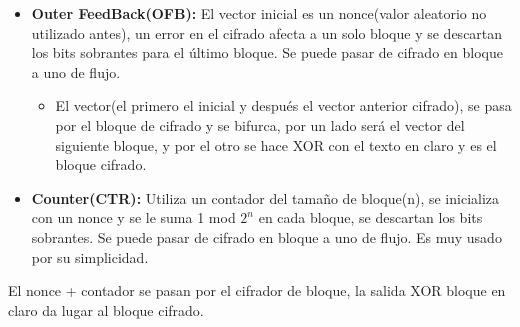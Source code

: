 \documentclass[12pt, twoside, openright]{report} %
\begin{document}
\begin{itemize}
	\item \textbf{Outer FeedBack(OFB):} El vector inicial es un nonce(valor aleatorio no utilizado antes), un error en el cifrado afecta a un solo bloque y se descartan los bits sobrantes para el último bloque. Se puede pasar de cifrado en bloque a uno de flujo.
	      \begin{itemize}
		      \item El vector(el primero el inicial y después el vector anterior cifrado), se pasa por el bloque de cifrado y se bifurca, por un lado será el vector del siguiente bloque, y por el otro se hace XOR con el texto en claro y es el bloque cifrado.
	      \end{itemize}
	\item \textbf{Counter(CTR):} Utiliza un contador del tamaño de bloque(n), se inicializa con un nonce y se le suma 1 mod $2^n$ en cada bloque, se descartan los bits sobrantes. Se puede pasar de cifrado en bloque a uno de flujo. Es muy usado por su simplicidad.
\end{itemize}
El nonce + contador se pasan por el cifrador de bloque, la salida XOR bloque en claro da lugar al bloque cifrado.
\pagebreak
\end{document}

